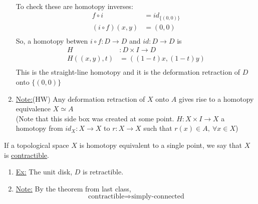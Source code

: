 \begin{enumerate}
\begin{align*}
            \end{align*}
            To check these are homotopy inverses:
            \begin{align*}
                f\circ i &= id_{\{(0,0)\}}\\
                (i\circ f)(x,y)&=(0,0)\\
            \end{align*}
            So, a homotopy betwen $i\circ f: D \rightarrow D$ and $id: D\rightarrow D$ is
            \begin{align*}
                H&: D\times I \rightarrow D\\
                H((x,y), t)&=((1-t)x, (1-t)y)\\
            \end{align*}
            This is the straight-line homotopy and it is the deformation retraction of $D$
            onto $\{(0,0)\}$
        \item \underline{Note:}(HW) Any deformation retraction of $X$ onto $A$
            gives rise to a homotopy equivalence $X\simeq A$\\
            (Note that this side box was created at some point.
            $H:X\times I \rightarrow X$ a homotopy from $id_X:X\rightarrow X$
            to $r:X\rightarrow X$ such that $r(x)\in A,\ \forall x\in X$)
    \end{enumerate}
    \begin{definition}
        If a topological space $X$ is homotopy equivalent to a single point, we say that $X$ is \underline{contractible}.
    \end{definition}
    \begin{enumerate}
        \item\underline{Ex:} The unit disk, $D$ is retractible.
        \item \underline{Note:} By the theorem from last class,
            \[
                \text{contractible}\Rightarrow \text{simply-connected}
            \]
    \end{enumerate}

